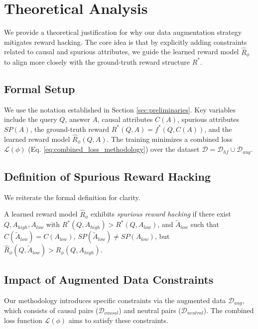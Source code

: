 
\section{Theoretical Analysis}
\label{sec:theory}

We provide a theoretical justification for why our data augmentation strategy mitigates reward hacking. The core idea is that by explicitly adding constraints related to causal and spurious attributes, we guide the learned reward model $\hat{R}_\phi$ to align more closely with the ground-truth reward structure $R^*$.

\subsection{Formal Setup}
We use the notation established in Section \ref{sec:preliminaries}. Key variables include the query $Q$, answer $A$, causal attributes $C(A)$, spurious attributes $SP(A)$, the ground-truth reward $R^*(Q, A) = f^*(Q, C(A))$, and the learned reward model $\hat{R}_\phi(Q, A)$. The training minimizes a combined loss $\mathcal{L}(\phi)$ (Eq. \ref{eq:combined_loss_methodology}) over the dataset $\mathcal{D} = \mathcal{D}_{hf} \cup \mathcal{D}_{aug}$.

\subsection{Definition of Spurious Reward Hacking}
We reiterate the formal definition for clarity.

\begin{definition}
\label{def:reward_hacking_formal_simple}
A learned reward model $\hat{R}_\phi$ exhibits \emph{spurious reward hacking} if there exist $Q, A_{high}, A_{low}$ with $R^*(Q, A_{high}) > R^*(Q, A_{low})$, and $\tilde{A}_{low}$ such that $C(\tilde{A}_{low}) = C(A_{low})$, $SP(\tilde{A}_{low}) \neq SP(A_{low})$, but $\hat{R}_\phi(Q, \tilde{A}_{low}) > \hat{R}_\phi(Q, A_{high})$.
\end{definition}

\subsection{Impact of Augmented Data Constraints}

Our methodology introduces specific constraints via the augmented data $\mathcal{D}_{aug}$, which consists of causal pairs ($\mathcal{D}_{causal}$) and neutral pairs ($\mathcal{D}_{neutral}$). The combined loss function $\mathcal{L}(\phi)$ aims to satisfy these constraints.

